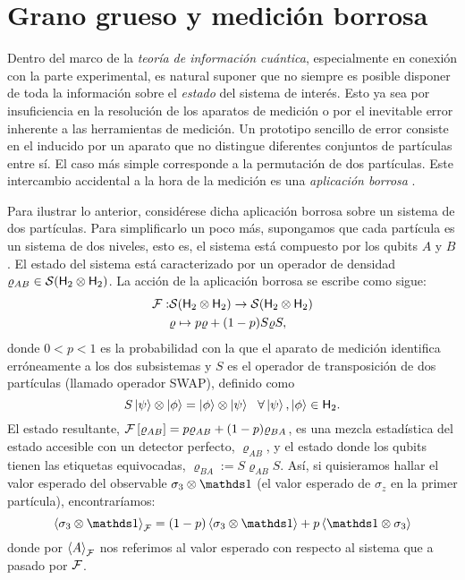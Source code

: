 \section{Grano grueso y medición borrosa}


Dentro del marco de la \textit{teoría de información cuántica}, especialmente en conexión con la parte experimental, es natural suponer que no siempre es posible disponer de toda la información sobre el \textit{estado} del sistema de interés. Esto ya sea por insuficiencia en la resolución de los aparatos de medición o por el inevitable error inherente a las herramientas de medición. Un prototipo sencillo de error consiste en el inducido por un aparato que no distingue diferentes conjuntos de partículas entre sí. El caso más simple corresponde a la permutación de dos partículas. Este intercambio accidental a la hora de la medición es una \textit{aplicación borrosa} \cite{FuzzyMeasurements}.

Para ilustrar lo anterior, considérese dicha aplicación borrosa sobre un sistema de dos partículas. Para simplificarlo un poco más, supongamos que cada partícula es un sistema de dos niveles, esto es, el sistema está compuesto por los qubits $A$ y $B$. El estado del sistema está caracterizado por un operador de densidad $\varrho_{AB} \in \mathcal{S}({\sf H}_2 \otimes {\sf H}_2)$. La acción de la aplicación borrosa se escribe como sigue:
\begin{align*}
\mathcal{F}:&\mathcal{S}({\sf H}_2 \otimes {\sf H}_2)\to \mathcal{S}({\sf H}_2 \otimes {\sf H}_2)\nonumber\\
&\varrho \mapsto p\varrho+(1-p)S\varrho S,
\end{align*}
donde $0<p<1$ es la probabilidad con la que el aparato de medición identifica erróneamente a los dos subsistemas y $S$ es el operador de transposición de dos partículas (llamado operador SWAP), definido como 
\begin{equation*}
    S\ket{\psi}\otimes \ket{\phi}=\ket{\phi}\otimes \ket{\psi} \ \ \forall \ket{\psi},\ket{\phi}\in {\sf H}_2.
\end{equation*}
El estado resultante, $\mathcal{F}\left[\varrho_{AB}\right]=p\varrho_{AB}+(1-p)\varrho_{BA}$, es una mezcla estadística del estado accesible con un detector perfecto, $\varrho_{AB}$, y el estado donde los qubits tienen las etiquetas equivocadas, $\varrho_{BA}:=S\varrho_{AB} S$. Así, si quisieramos hallar el valor esperado del observable $\sigma_{3}\otimes\Id$ (el valor esperado de $\sigma_{z}$ en la primer partícula), encontraríamos:
\begin{equation*}
    \expval{\sigma_{3}\otimes\Id}_{\mcF}=(1-p)\expval{\sigma_{3}\otimes\Id}+p\expval{\Id\otimes\sigma_{3}}
\end{equation*}
donde por $\expval{A}_{\mathcal{F}}$ nos referimos al valor esperado con respecto al sistema que a pasado por $\mathcal{F}$.

